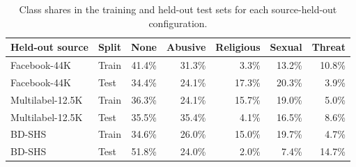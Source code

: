 \documentclass[11pt,a4paper]{article}
\begin{document}
\begin{table}[!htbp]
\centering
\caption{Class shares in the training and held-out test sets for each source-held-out configuration.}
\label{tab:holdout-priors}
\scriptsize
\begin{tabular}{@{}llrrrrr@{}}
\toprule
\textbf{Held-out source} & \textbf{Split} & \textbf{None} & \textbf{Abusive} & \textbf{Religious} & \textbf{Sexual} & \textbf{Threat} \\
\midrule
Facebook-44K & Train & 41.4\% & 31.3\% & 3.3\% & 13.2\% & 10.8\% \\
Facebook-44K & Test  & 34.4\% & 24.1\% & 17.3\% & 20.3\% & 3.9\% \\
Multilabel-12.5K & Train & 36.3\% & 24.1\% & 15.7\% & 19.0\% & 5.0\% \\
Multilabel-12.5K & Test  & 35.5\% & 35.4\% & 4.1\% & 16.5\% & 8.6\% \\
BD-SHS & Train & 34.6\% & 26.0\% & 15.0\% & 19.7\% & 4.7\% \\
BD-SHS & Test  & 51.8\% & 24.0\% & 2.0\% & 7.4\% & 14.7\% \\
\bottomrule
\end{tabular}
\end{table}


{\footnotesize
}
\end{document}
